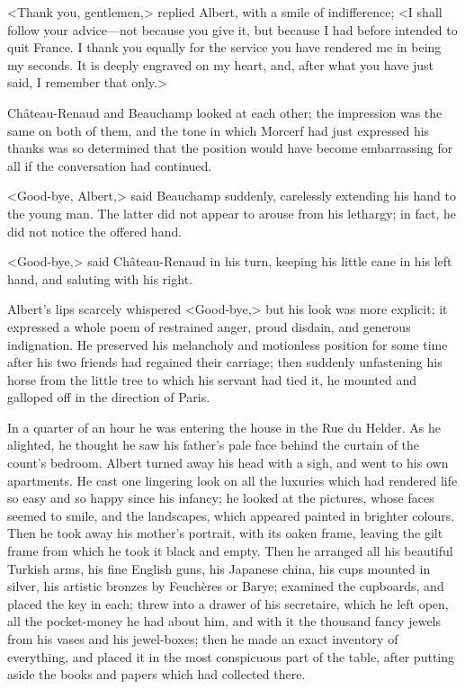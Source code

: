  <Thank you, gentlemen,> replied Albert, with a smile of indifference; <I shall follow your advice—not because you give it, but because I had before intended to quit France. I thank you equally for the service you have rendered me in being my seconds. It is deeply engraved on my heart, and, after what you have just said, I remember that only.> 

 Château-Renaud and Beauchamp looked at each other; the impression was the same on both of them, and the tone in which Morcerf had just expressed his thanks was so determined that the position would have become embarrassing for all if the conversation had continued. 

 <Good-bye, Albert,> said Beauchamp suddenly, carelessly extending his hand to the young man. The latter did not appear to arouse from his lethargy; in fact, he did not notice the offered hand. 

 <Good-bye,> said Château-Renaud in his turn, keeping his little cane in his left hand, and saluting with his right. 

 Albert's lips scarcely whispered <Good-bye,> but his look was more explicit; it expressed a whole poem of restrained anger, proud disdain, and generous indignation. He preserved his melancholy and motionless position for some time after his two friends had regained their carriage; then suddenly unfastening his horse from the little tree to which his servant had tied it, he mounted and galloped off in the direction of Paris. 

 In a quarter of an hour he was entering the house in the Rue du Helder. As he alighted, he thought he saw his father's pale face behind the curtain of the count's bedroom. Albert turned away his head with a sigh, and went to his own apartments. He cast one lingering look on all the luxuries which had rendered life so easy and so happy since his infancy; he looked at the pictures, whose faces seemed to smile, and the landscapes, which appeared painted in brighter colours. Then he took away his mother's portrait, with its oaken frame, leaving the gilt frame from which he took it black and empty. Then he arranged all his beautiful Turkish arms, his fine English guns, his Japanese china, his cups mounted in silver, his artistic bronzes by Feuchères or Barye; examined the cupboards, and placed the key in each; threw into a drawer of his secretaire, which he left open, all the pocket-money he had about him, and with it the thousand fancy jewels from his vases and his jewel-boxes; then he made an exact inventory of everything, and placed it in the most conspicuous part of the table, after putting aside the books and papers which had collected there. 

